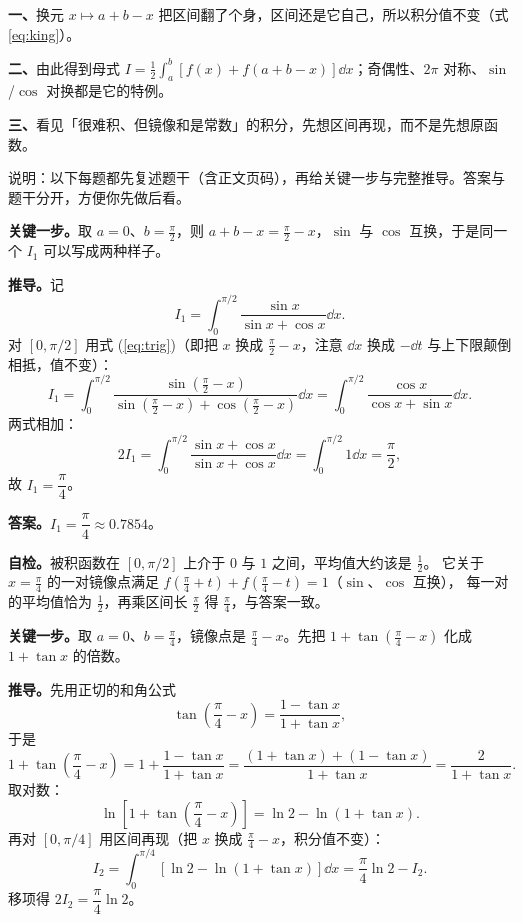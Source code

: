 \documentclass[11pt]{ctexart}
\newcommand{\qhalf}{\needspace{0.50\textheight}}
\begin{document}

\noindent\textbf{一、}换元 $x\mapsto a+b-x$ 把区间翻了个身，区间还是它自己，所以积分值不变（式 \ref{eq:king}）。

\noindent\textbf{二、}由此得到母式 $I=\frac12\int_a^b[f(x)+f(a+b-x)]\dd x$；奇偶性、$2\pi$ 对称、$\sin$/$\cos$ 对换都是它的特例。

\noindent\textbf{三、}看见「很难积、但镜像和是常数」的积分，先想区间再现，而不是先想原函数。

\flowerrule


\noindent 说明：以下每题都先复述题干（含正文页码），再给关键一步与完整推导。答案与题干分开，方便你先做后看。

\qhalf
{}
\label{sol1}

\textbf{关键一步。}取 $a=0$、$b=\frac{\pi}{2}$，则 $a+b-x=\frac{\pi}{2}-x$，$\sin$ 与 $\cos$ 互换，于是同一个 $I_1$ 可以写成两种样子。

\textbf{推导。}记
\[
I_1=\int_0^{\pi/2}\frac{\sin x}{\sin x+\cos x}\dd x .
\]
对 $[0,\pi/2]$ 用式 (\ref{eq:trig})（即把 $x$ 换成 $\frac{\pi}{2}-x$，注意 $\dd x$ 换成 $-\dd t$ 与上下限颠倒相抵，值不变）：
\[
I_1=\int_0^{\pi/2}\frac{\sin\left(\frac{\pi}{2}-x\right)}{\sin\left(\frac{\pi}{2}-x\right)+\cos\left(\frac{\pi}{2}-x\right)}\dd x
=\int_0^{\pi/2}\frac{\cos x}{\cos x+\sin x}\dd x .
\]
两式相加：
\[
2I_1=\int_0^{\pi/2}\frac{\sin x+\cos x}{\sin x+\cos x}\dd x=\int_0^{\pi/2}1\dd x=\frac{\pi}{2},
\]
故 $I_1=\dfrac{\pi}{4}$。

\textbf{答案。}$I_1=\dfrac{\pi}{4}\approx 0.7854$。

\textbf{自检。}被积函数在 $[0,\pi/2]$ 上介于 $0$ 与 $1$ 之间，平均值大约该是 $\frac12$。
它关于 $x=\frac{\pi}{4}$ 的一对镜像点满足 $f\left(\frac{\pi}{4}+t\right)+f\left(\frac{\pi}{4}-t\right)=1$（$\sin$、$\cos$ 互换），
每一对的平均值恰为 $\frac12$，再乘区间长 $\frac{\pi}{2}$ 得 $\frac{\pi}{4}$，与答案一致。

\qhalf
{}
\label{sol2}

\textbf{关键一步。}取 $a=0$、$b=\frac{\pi}{4}$，镜像点是 $\frac{\pi}{4}-x$。先把 $1+\tan\left(\frac{\pi}{4}-x\right)$ 化成 $1+\tan x$ 的倍数。

\textbf{推导。}先用正切的和角公式
\[
\tan\left(\frac{\pi}{4}-x\right)=\frac{1-\tan x}{1+\tan x},
\]
于是
\[
1+\tan\left(\frac{\pi}{4}-x\right)=1+\frac{1-\tan x}{1+\tan x}
=\frac{(1+\tan x)+(1-\tan x)}{1+\tan x}=\frac{2}{1+\tan x}.
\]
取对数：
\[
\ln\left[1+\tan\left(\frac{\pi}{4}-x\right)\right]=\ln 2-\ln(1+\tan x).
\]
再对 $[0,\pi/4]$ 用区间再现（把 $x$ 换成 $\frac{\pi}{4}-x$，积分值不变）：
\[
I_2=\int_0^{\pi/4}\left[\ln 2-\ln(1+\tan x)\right]\dd x
=\frac{\pi}{4}\ln 2-I_2 .
\]
移项得 $2I_2=\dfrac{\pi}{4}\ln 2$。
\end{document}
